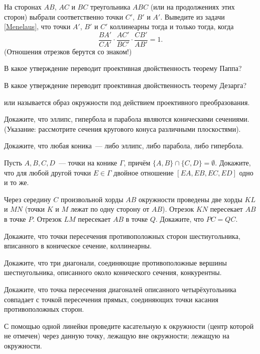 \documentclass[a4paper,12pt]{article}
\begin{document}
 На сторонах $AB$, $AC$ и $BC$ треугольника
$ABC$ (или на продолжениях этих сторон) выбрали соответственно точки
$C'$, $B'$ и $A'$. Выведите из задачи \ref{Menelaus}, что точки
$A'$, $B'$ и $C'$ коллинеарны тогда и только тогда, когда
$$
\frac{BA'}{CA'}\cdot\frac{AC'}{BC'}\cdot\frac{CB'}{AB'}=1.
$$
(Отношения отрезков берутся со знаком!) 

 В какое утверждение переводит проективная двойственность
теорему Паппа? 

 В какое утверждение переводит проективная двойственность
теорему Дезарга? 


\vfill
{}
\newpage


  или  называется образ
окружности под действием проективного преобразования. 

 Докажите, что эллипс, гипербола и парабола являются
коническими сечениями. (Указание: рассмотрите сечения кругового
конуса различными плоскостями). 

 Докажите, что любая коника~--- либо эллипс, либо парабола,
либо гипербола. 

 Пусть $A,B,C,D$~--- точки на конике $\Gamma$, причём
$\{A,B\}\cap\{C,D\} = \emptyset$. Докажите, что для любой другой
точки $E\in\Gamma$ двойное отношение $[EA,EB,EC,ED]$ одно и то же.

 Через середину $C$ произвольной хорды $AB$
окружности проведены две хорды $KL$ и $MN$ (точки $K$ и $M$ лежат по
одну сторону от $AB$). Отрезок $KN$ пересекает $AB$ в точке $P$.
Отрезок $LM$ пересекает $AB$ в точке $Q$. Докажите, что $PC = QC$.

 Докажите, что точки пересечения
противоположных сторон шестиугольника, вписанного в коническое
сечение, коллинеарны. 

 Докажите, что три диагонали, соединяющие
противоположные вершины шестиугольника, описанного около конического
сечения, конкурентны. 

 Докажите, что точка пересечения диагоналей описанного
четырёхугольника совпадает с точкой пересечения прямых, соединяющих
точки касания противоположных сторон. 



 С помощью одной линейки проведите касательную к окружности
(центр которой не отмечен) через данную точку,  
лежащую вне окружности;  лежащую на окружности. 
\end{document}
